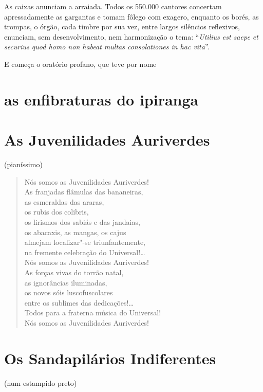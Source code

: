 As caixas anunciam a arraiada. Todos os 550.000 cantores concertam
apressadamente as gargantas e tomam fôlego com exagero, enquanto os
borés, as trompas, o órgão, cada timbre por sua vez, entre largos
silêncios reflexivos, enunciam, sem desenvolvimento, nem harmonização o
tema: ``\emph{Utilius est saepe et securius quod homo non habeat multas
consolationes in hāc vitā}''.

E começa o oratório profano, que teve por nome

\section*{as enfibraturas do ipiranga}

\section*{As Juvenilidades Auriverdes}

\hfill{}(pianíssimo)

\begin{verse}
Nós somos as Juvenilidades Auriverdes!\\
As franjadas flâmulas das bananeiras,\\
as esmeraldas das araras,\\
os rubis dos colibris,\\
os lirismos dos sabiás e das jandaias,\\
os abacaxis, as mangas, os cajus\\
almejam localizar"-se triunfantemente,\\
na fremente celebração do Universal!\ldots{}\\
Nós somos as Juvenilidades Auriverdes!\\
As forças vivas do torrão natal,\\
as ignorâncias iluminadas,\\
os novos sóis luscofuscolares\\
entre os sublimes das dedicações!\ldots{}\\
Todos para a fraterna música do Universal!\\
Nós somos as Juvenilidades Auriverdes!
\end{verse}

\section*{Os Sandapilários Indiferentes}

\hfill{}(num estampido preto)

